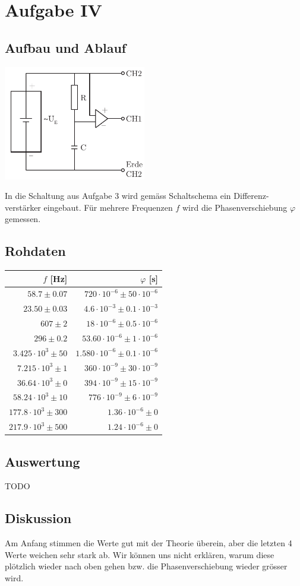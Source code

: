\documentclass[12pt,a4paper]{article}
\begin{document}
\section*{Aufgabe IV}
\subsection*{Aufbau und Ablauf}
\includegraphics[height=5cm]{illustration4.pdf}

\noindent
In die Schaltung aus Aufgabe 3 wird gem\"ass Schaltschema ein Differenz-verst\"arker eingebaut. F\"ur mehrere Frequenzen $f$ wird die Phasenverschiebung $\varphi$ gemessen.

\subsection*{Rohdaten}
\begin{tabular}{|r|r|}
\hline
$f$ [Hz]&$\varphi$ [s]\\
\hline
$58.7 \pm 0.07$&$720\cdot 10^{-6} \pm 50\cdot 10^{-6}$\\
$23.50 \pm 0.03$&$4.6\cdot 10^{-3} \pm 0.1\cdot 10^{-3}$\\
$607 \pm 2$&$18\cdot 10^{-6} \pm 0.5\cdot 10^{-6}$\\
$296 \pm 0.2$&$53.60\cdot 10^{-6} \pm 1\cdot 10^{-6}$\\
$3.425\cdot 10^{3} \pm 50$&$1.580\cdot 10^{-6} \pm 0.1\cdot 10^{-6}$\\
$7.215\cdot 10^{3} \pm 1$&$360\cdot 10^{-9} \pm 30\cdot 10^{-9}$\\
$36.64\cdot 10^{3} \pm 0$&$394\cdot 10^{-9} \pm 15\cdot 10^{-9}$\\
$58.24\cdot 10^{3} \pm 10$&$776\cdot 10^{-9} \pm 6\cdot 10^{-9}$\\
$177.8\cdot 10^{3} \pm 300$&$1.36\cdot 10^{-6} \pm 0$\\
$217.9\cdot 10^{3} \pm 500$&$1.24\cdot 10^{-6} \pm 0$\\
\hline
\end{tabular}

\subsection*{Auswertung}
TODO

\subsection*{Diskussion}
Am Anfang stimmen die Werte gut mit der Theorie \"uberein, aber die letzten 4 Werte weichen sehr stark ab. Wir k\"onnen uns nicht erkl\"aren, warum diese pl\"otzlich wieder nach oben gehen bzw. die Phasenverschiebung wieder gr\"osser wird.
\end{document}

